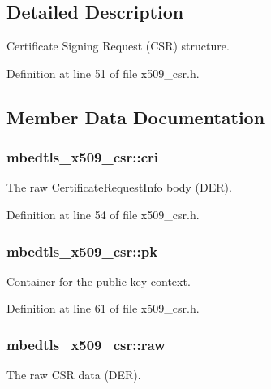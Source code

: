 \subsection{Detailed Description}
Certificate Signing Request (C\-S\-R) structure. 

Definition at line 51 of file x509\-\_\-csr.\-h.



\subsection{Member Data Documentation}
\hypertarget{structmbedtls__x509__csr_a6adcb10c37a6bc946310d54567468f8a}{
\subsubsection[{cri}]{ mbedtls\-\_\-x509\-\_\-csr\-::cri}}\label{structmbedtls__x509__csr_a6adcb10c37a6bc946310d54567468f8a}
The raw Certificate\-Request\-Info body (D\-E\-R). 

Definition at line 54 of file x509\-\_\-csr.\-h.

\hypertarget{structmbedtls__x509__csr_abacfec387e945f59a35a106eebba0a1c}{
\subsubsection[{pk}]{ mbedtls\-\_\-x509\-\_\-csr\-::pk}}\label{structmbedtls__x509__csr_abacfec387e945f59a35a106eebba0a1c}
Container for the public key context. 

Definition at line 61 of file x509\-\_\-csr.\-h.

\hypertarget{structmbedtls__x509__csr_ad3c60458143eb1ddedfa573466931a70}{
\subsubsection[{raw}]{ mbedtls\-\_\-x509\-\_\-csr\-::raw}}\label{structmbedtls__x509__csr_ad3c60458143eb1ddedfa573466931a70}
The raw C\-S\-R data (D\-E\-R). 

